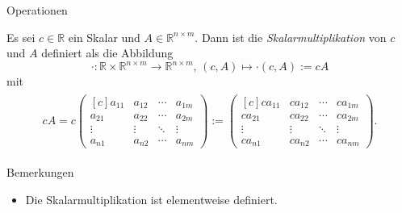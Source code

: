 \documentclass[
  8pt,
  ignorenonframetext,
]{beamer}
\providecommand{\tightlist}{%
  \setlength{\itemsep}{0pt}\setlength{\parskip}{0pt}}
\begin{document}
\begin{frame}{Operationen}
\protect\hypertarget{operationen-6}{}
\footnotesize
\begin{definition}[Skalarmultiplikation]
Es sei $c \in \mathbb{R}$ ein Skalar und $A \in \mathbb{R}^{n\times m}$. Dann
ist die \textit{Skalarmultiplikation} von $c$ und $A$ definiert als die Abbildung
\begin{equation}
\cdot : \mathbb{R} \times \mathbb{R}^{n\times m} \to \mathbb{R}^{n\times m}, \,
(c,A) \mapsto \cdot (c,A) := cA
\end{equation}
mit
\begin{align}
\begin{split}
cA
=
c
\begin{pmatrix*}[c]
a_{11} & a_{12} & \cdots & a_{1m} \\
a_{21} & a_{22} & \cdots & a_{2m} \\
\vdots & \vdots & \ddots & \vdots \\
a_{n1} & a_{n2} & \cdots & a_{nm}
\end{pmatrix*}
:=
\begin{pmatrix*}[c]
ca_{11} & ca_{12} & \cdots & ca_{1m}  \\
ca_{21} & ca_{22} & \cdots & ca_{2m}  \\
\vdots  & \vdots  & \ddots & \vdots    \\
ca_{n1} & ca_{n2} & \cdots & ca_{nm}
\end{pmatrix*}.
\end{split}
\end{align}
\end{definition}

Bemerkungen

\begin{itemize}
\tightlist
\item
  Die Skalarmultiplikation ist elementweise definiert.
\end{itemize}
\end{frame}
\end{document}
